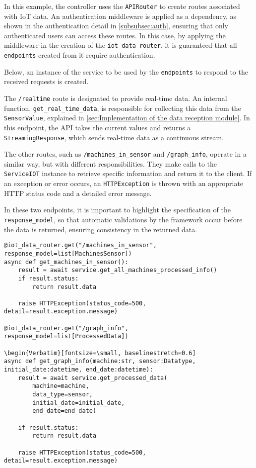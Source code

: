 In this example, the controller uses the \texttt{APIRouter} to create routes associated with IoT data. An authentication middleware is applied as a dependency, as shown in the authentication detail in \ref{subsubsec:auth}, ensuring that only authenticated users can access these routes. In this case, by applying the middleware in the creation of the \texttt{iot\_data\_router}, it is guaranteed that all \texttt{endpoints} created from it require authentication.

Below, an instance of the service to be used by the \texttt{endpoints} to respond to the received requests is created.

The \texttt{/realtime} route is designated to provide real-time data. An internal function, \texttt{get\_real\_time\_data}, is responsible for collecting this data from the \texttt{SensorValue}, explained in \ref{sec:Implementation of the data reception module}. In this endpoint, the \gls{API} takes the current values and returns a \texttt{StreamingResponse}, which sends real-time data as a continuous stream.

The other routes, such as \texttt{/machines\_in\_sensor} and \texttt{/graph\_info}, operate in a similar way, but with different responsibilities. They make calls to the \texttt{ServiceIOT} instance to retrieve specific information and return it to the client. If an exception or error occurs, an \texttt{HTTPException} is thrown with an appropriate HTTP status code and a detailed error message.

In these two endpoints, it is important to highlight the specification of the \texttt{response\_model}, so that automatic validations by the framework occur before the data is returned, ensuring consistency in the returned data.

\begin{Verbatim}[fontsize=\small, baselinestretch=0.6]
@iot_data_router.get("/machines_in_sensor", response_model=list[MachinesSensor])
async def get_machines_in_sensor():
    result = await service.get_all_machines_processed_info()
    if result.status:
        return result.data
    
    raise HTTPException(status_code=500, detail=result.exception.message)

@iot_data_router.get("/graph_info", response_model=list[ProcessedData])

\begin{Verbatim}[fontsize=\small, baselinestretch=0.6]
async def get_graph_info(machine:str, sensor:Datatype, initial_date:datetime, end_date:datetime):
    result = await service.get_processed_data(
        machine=machine,
        data_type=sensor,
        initial_date=initial_date,
        end_date=end_date)
    
    if result.status:
        return result.data
    
    raise HTTPException(status_code=500, detail=result.exception.message)
\end{Verbatim}

